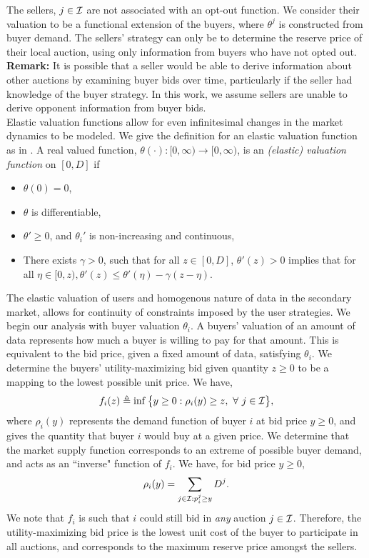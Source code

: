 The sellers, $j\in\mathcal{I}$ are not associated with an opt-out function. We
consider their valuation to be a functional extension of the buyers, where
$\theta^j$ is constructed from buyer demand.
The sellers' strategy can only be to determine the reserve price of their local
auction, using only information from buyers who have not opted out.
\\
\textbf{Remark:}
It is possible that a seller would be able to derive information about other
auctions by examining buyer bids over time, particularly if the seller had
knowledge of the buyer strategy. In this work, we assume sellers are unable to
derive opponent information from buyer bids. \\

Elastic valuation functions allow for even infinitesimal changes in the market
dynamics to be modeled. We give the definition for an elastic valuation
function as in \cite{lazar}.
A real valued function, $\theta(\cdot): [0,\infty) \rightarrow [0,\infty)$, is an \emph{(elastic) valuation
function} on $[0, D]$ if 
\begin{itemize}
    \item $\theta(0) = 0$,
    \item $\theta$ is differentiable,
    \item ${\theta}' \ge 0$, and ${\theta_i}'$ is non-increasing and continuous,
     \item There exists $\gamma > 0$, such that for all $z \in [0,D]$,
${\theta}'(z) > 0$ implies that for all $\eta \in [0, z), {\theta}'(z) \le
{\theta}'(\eta)
- \gamma(z - \eta)$. 
\end{itemize}

The elastic valuation of users and homogenous nature of data in the secondary market, 
allows for continuity of constraints imposed by the user strategies. 
We begin our analysis with buyer valuation $\theta_i$.
A buyers' valuation of an amount of data represents how much a buyer is willing
to pay for that amount. 
This is equivalent to the bid price, given a fixed amount of data,
satisfying $\theta_i$. We determine the
buyers' utility-maximizing bid given quantity $z\ge0$ to be a mapping to the lowest
possible unit price. We have,
\begin{equation}\label{buyerinversedemand}
    f_i(z) \triangleq \inf\big\lbrace y\ge 0:
        \rho_i(y) \ge z, \ \forall \ j \in \mathcal{I}\big\rbrace,
\end{equation}
where $\rho_i(y)$ represents the demand function of buyer $i$ at bid price
$y\ge 0$, and gives the quantity that buyer $i$ would buy at a given price.
We determine that the market supply function corresponds to an extreme of
possible buyer demand, and 
acts as an ``inverse" function of $f_i$. We have, for bid price $y\ge 0$,
\begin{equation}\label{datasupply}
    \rho_i(y) = \sum_{j\in\mathcal{I} : p_i^j\ge y} D^j.
\end{equation}
We note that $f_i$ is such that
$i$ could still bid in \emph{any} auction $j\in\mathcal{I}$.
Therefore, the utility-maximizing bid price is the
lowest unit cost of the buyer to participate in all auctions, and corresponds to
the maximum reserve price amongst the sellers. 

